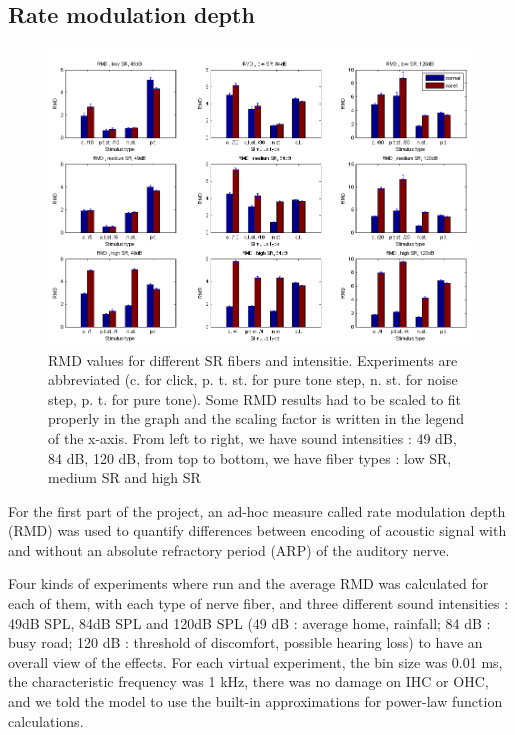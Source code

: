 
\subsection{Rate modulation depth}

\begin{figure}[ht]
	\centering
  \includegraphics[width=\textwidth]{images/rmds9.png} %
	\caption{RMD values for different SR fibers and intensitie. Experiments are abbreviated 
	(c. for click, p. t. st. for pure tone step, n. st. for noise step, p. t. for pure tone).
	Some RMD results had to be scaled to fit properly in the graph and the scaling factor is written in the legend of the x-axis.
	From left to right, we have sound intensities : 49 dB, 84 dB, 120 dB,
	from top to bottom, we have fiber types : low SR, medium SR and high SR}
	\label{fig:rmds}
\end{figure}

For the first part of the project, an ad-hoc measure called rate 
modulation depth (RMD) was used to quantify differences between encoding 
of acoustic signal with and without an absolute refractory period (ARP) of the auditory nerve.

Four kinds of experiments where run and the average RMD was calculated 
for each of them, 
with each type of nerve fiber, and three different sound intensities : 
49dB SPL, 84dB SPL and 120dB SPL (49 dB : average home, rainfall; 84 dB : busy road; 120 dB : threshold of discomfort, possible hearing loss) 
to have an overall view of the effects.
For each virtual experiment, the bin size was 0.01 ms, the characteristic frequency was 1 kHz, 
there was no damage on IHC or OHC, and we told the model to use the built-in approximations 
for power-law function calculations.

